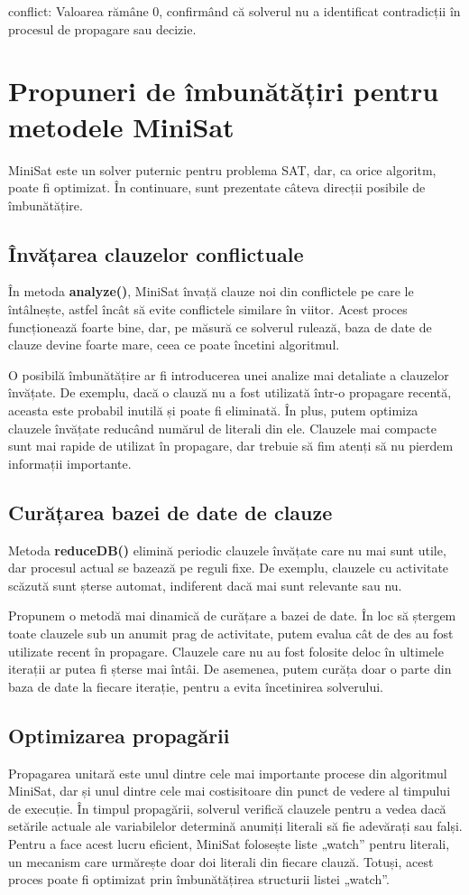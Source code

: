 \documentclass[runningheads]{llncs}
\begin{document}
conflict: Valoarea rămâne 0, confirmând că solverul nu a identificat contradicții în procesul de propagare sau decizie.


\section{Propuneri de îmbunătățiri pentru metodele MiniSat}  
MiniSat este un solver puternic pentru problema SAT, dar, ca orice algoritm, poate fi optimizat. În continuare, sunt prezentate câteva direcții posibile de îmbunătățire. \cite{een2006sat} \cite{heule2015efficient}

\subsection{Învățarea clauzelor conflictuale}  
În metoda \textbf{analyze()}, MiniSat învață clauze noi din conflictele pe care le întâlnește, astfel încât să evite conflictele similare în viitor. Acest proces funcționează foarte bine, dar, pe măsură ce solverul rulează, baza de date de clauze devine foarte mare, ceea ce poate încetini algoritmul.

O posibilă îmbunătățire ar fi introducerea unei analize mai detaliate a clauzelor învățate. De exemplu, dacă o clauză nu a fost utilizată într-o propagare recentă, aceasta este probabil inutilă și poate fi eliminată. În plus, putem optimiza clauzele învățate reducând numărul de literali din ele. Clauzele mai compacte sunt mai rapide de utilizat în propagare, dar trebuie să fim atenți să nu pierdem informații importante.

\subsection{Curățarea bazei de date de clauze}  
Metoda \textbf{reduceDB()} elimină periodic clauzele învățate care nu mai sunt utile, dar procesul actual se bazează pe reguli fixe. De exemplu, clauzele cu activitate scăzută sunt șterse automat, indiferent dacă mai sunt relevante sau nu.

Propunem o metodă mai dinamică de curățare a bazei de date. În loc să ștergem toate clauzele sub un anumit prag de activitate, putem evalua cât de des au fost utilizate recent în propagare. Clauzele care nu au fost folosite deloc în ultimele iterații ar putea fi șterse mai întâi. De asemenea, putem curăța doar o parte din baza de date la fiecare iterație, pentru a evita încetinirea solverului.

\subsection{Optimizarea propagării} 
Propagarea unitară este unul dintre cele mai importante procese din algoritmul MiniSat, dar și unul dintre cele mai costisitoare din punct de vedere al timpului de execuție. În timpul propagării, solverul verifică clauzele pentru a vedea dacă setările actuale ale variabilelor determină anumiți literali să fie adevărați sau falși. Pentru a face acest lucru eficient, MiniSat folosește liste „watch” pentru literali, un mecanism care urmărește doar doi literali din fiecare clauză. Totuși, acest proces poate fi optimizat prin îmbunătățirea structurii listei „watch”.
\end{document}

